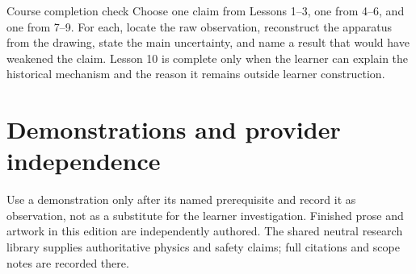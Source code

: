 \begin{gate}{Course completion check}
Choose one claim from Lessons 1--3, one from 4--6, and one from 7--9. For each,
locate the raw observation, reconstruct the apparatus from the drawing, state
the main uncertainty, and name a result that would have weakened the claim.
Lesson 10 is complete only when the learner can explain the historical
mechanism and the reason it remains outside learner construction.
\end{gate}

\section{Demonstrations and provider independence}
Use a demonstration only after its named prerequisite and record it as
observation, not as a substitute for the learner investigation. Finished prose
and artwork in this edition are independently authored. The shared neutral
research library supplies authoritative physics and safety claims; full
citations and scope notes are recorded there. \sourcefoot

